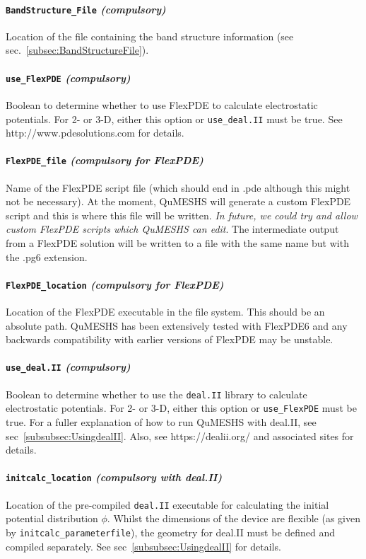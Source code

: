 \documentclass[12pt]{article}
\newcommand{\red}[1]{{\color{red} \it #1}}
\begin{document}
\paragraph{\texttt{BandStructure\_File} \emph{(compulsory)}}
Location of the file containing the band structure information (see
sec.~\ref{subsec:BandStructureFile}).

\paragraph{\texttt{use\_FlexPDE} \emph{(compulsory)}}
Boolean to determine whether to use FlexPDE to calculate electrostatic potentials.
For 2- or 3-D, either this option or \texttt{use\_deal.II} must be true.  See
http://www.pdesolutions.com for details.

\paragraph{\texttt{FlexPDE\_file} \emph{(compulsory for FlexPDE)}}
Name of the FlexPDE script file (which should end in .pde although this might
not be necessary).  At the moment, QuMESHS will generate a custom FlexPDE
script and this is where this file will be written. \red{In future, we could try
and allow custom FlexPDE scripts which QuMESHS can edit}.  The intermediate
output from a FlexPDE solution will be written to a file with the same name but
with the .pg6 extension.

\paragraph{\texttt{FlexPDE\_location} \emph{(compulsory for FlexPDE)}}
Location of the FlexPDE executable in the file system.  This should be an absolute
path.  QuMESHS has been extensively tested with FlexPDE6 and any backwards
compatibility with earlier versions of FlexPDE may be unstable.

\paragraph{\texttt{use\_deal.II} \emph{(compulsory)}}
Boolean to determine whether to use the \texttt{deal.II} library to calculate
electrostatic potentials.  For 2- or 3-D, either this option or
\texttt{use\_FlexPDE} must be true.  For a fuller explanation of how to
run QuMESHS with deal.II, see sec~\ref{subsubsec:UsingdealII}.  Also,
see https://dealii.org/ and associated sites for details.

\paragraph{\texttt{initcalc\_location} \emph{(compulsory with deal.II)}}
Location of the pre-compiled \texttt{deal.II} executable for calculating the initial
potential distribution $\phi$.  Whilst the dimensions of the device are flexible
(as given by \texttt{initcalc\_parameterfile}), the geometry for deal.II
must be defined and compiled separately.  See sec~\ref{subsubsec:UsingdealII}
for details.
\end{document}
